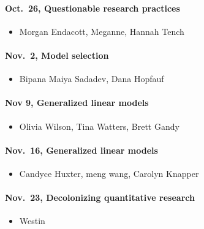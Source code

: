 \documentclass[
  letterpaper,
  DIV=11,
  numbers=noendperiod]{scrartcl}
\let\oldparagraph\paragraph
\renewcommand{\paragraph}[1]{\oldparagraph{#1}\mbox{}}
\providecommand{\tightlist}{%
  \setlength{\itemsep}{0pt}\setlength{\parskip}{0pt}}\usepackage{longtable,booktabs,array}
\begin{document}
\hypertarget{oct.-26-questionable-research-practices}{%
\paragraph{Oct.~26, Questionable research
practices}\label{oct.-26-questionable-research-practices}}

\begin{itemize}
\tightlist
\item
  Morgan Endacott, Meganne, Hannah Tench
\end{itemize}

\hypertarget{nov.-2-model-selection}{%
\paragraph{Nov.~2, Model selection}\label{nov.-2-model-selection}}

\begin{itemize}
\tightlist
\item
  Bipana Maiya Sadadev, Dana Hopfauf
\end{itemize}

\hypertarget{nov-9-generalized-linear-models}{%
\paragraph{Nov 9, Generalized linear
models}\label{nov-9-generalized-linear-models}}

\begin{itemize}
\tightlist
\item
  Olivia Wilson, Tina Watters, Brett Gandy
\end{itemize}

\hypertarget{nov.-16-generalized-linear-models}{%
\paragraph{Nov.~16, Generalized linear
models}\label{nov.-16-generalized-linear-models}}

\begin{itemize}
\tightlist
\item
  Candyce Huxter, meng wang, Carolyn Knapper
\end{itemize}

\hypertarget{nov.-23-decolonizing-quantitative-research}{%
\paragraph{Nov.~23, Decolonizing quantitative
research}\label{nov.-23-decolonizing-quantitative-research}}

\begin{itemize}
\tightlist
\item
  Westin
\end{itemize}
\end{document}
